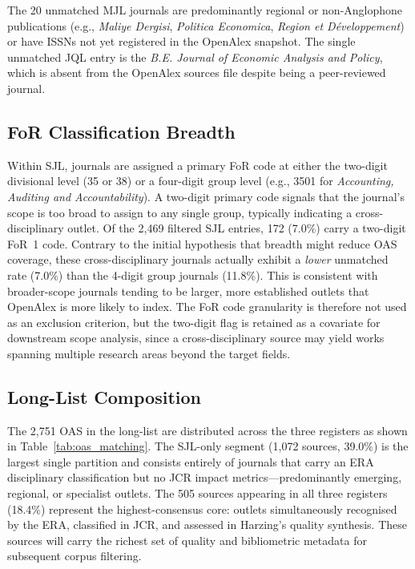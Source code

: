 The 20 unmatched MJL journals are predominantly regional or non-Anglophone publications
(e.g., \textit{Maliye Dergisi}, \textit{Politica Economica}, \textit{Region et
D\'eveloppement}) or have ISSNs not yet registered in the OpenAlex snapshot.
The single unmatched JQL entry is the
\textit{B.E. Journal of Economic Analysis and Policy}, which is absent from the
OpenAlex sources file despite being a peer-reviewed journal.

\subsection{FoR Classification Breadth}

Within SJL, journals are assigned a primary FoR code at either the two-digit
divisional level (35 or 38) or a four-digit group level (e.g., 3501 for
\textit{Accounting, Auditing and Accountability}).
A two-digit primary code signals that the journal's scope is too broad to assign
to any single group, typically indicating a cross-disciplinary outlet.
Of the 2{,}469 filtered SJL entries, 172 (7.0\%) carry a two-digit FoR~1 code.
Contrary to the initial hypothesis that breadth might reduce OAS coverage,
these cross-disciplinary journals actually exhibit a \textit{lower} unmatched rate
(7.0\%) than the 4-digit group journals (11.8\%).
This is consistent with broader-scope journals tending to be larger, more established
outlets that OpenAlex is more likely to index.
The FoR code granularity is therefore not used as an exclusion criterion,
but the two-digit flag is retained as a covariate for downstream scope analysis,
since a cross-disciplinary source may yield works spanning multiple research areas
beyond the target fields.

\subsection{Long-List Composition}

The 2{,}751 OAS in the long-list are distributed across the three registers as shown
in Table~\ref{tab:oas_matching}.
The SJL-only segment (1{,}072 sources, 39.0\%) is the largest single partition and
consists entirely of journals that carry an ERA disciplinary classification but
no JCR impact metrics---predominantly emerging, regional, or specialist outlets.
The 505 sources appearing in all three registers (18.4\%) represent the
highest-consensus core: outlets simultaneously recognised by the ERA,
classified in JCR, and assessed in Harzing's quality synthesis.
These sources will carry the richest set of quality and bibliometric metadata for
subsequent corpus filtering.

